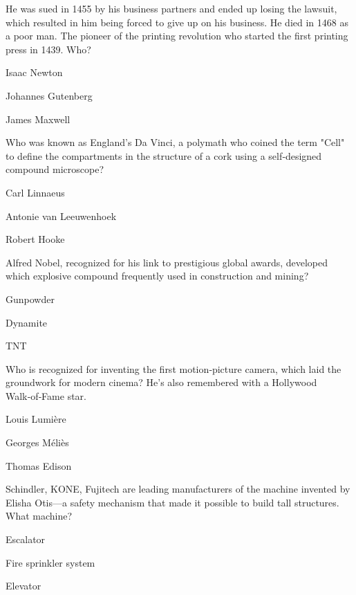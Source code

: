 
\begin{enhancedmcq}{He was sued in 1455 by his business partners and ended up losing the lawsuit, which resulted in him being forced to give up on his business. He died in 1468 as a poor man. The pioneer of the printing revolution who started the first printing press in 1439. Who?}
\item Isaac Newton
\item Johannes Gutenberg
\item James Maxwell

\end{enhancedmcq}
\begin{enhancedmcq}{Who was known as England's Da Vinci, a polymath who coined the term "Cell" to define the compartments in the structure of a cork using a self‑designed compound microscope?}
\item Carl Linnaeus
\item Antonie van Leeuwenhoek
\item Robert Hooke

\end{enhancedmcq}
\begin{enhancedmcq}{Alfred Nobel, recognized for his link to prestigious global awards, developed which explosive compound frequently used in construction and mining?}
\item Gunpowder
\item Dynamite
\item TNT

\end{enhancedmcq}
\begin{enhancedmcq}{Who is recognized for inventing the first motion‑picture camera, which laid the groundwork for modern cinema? He's also remembered with a Hollywood Walk‑of‑Fame star.}
\item Louis Lumière
\item Georges Méliès
\item Thomas Edison

\end{enhancedmcq}
\begin{enhancedmcq}{Schindler, KONE, Fujitech are leading manufacturers of the machine invented by Elisha Otis—a safety mechanism that made it possible to build tall structures. What machine?}
\item Escalator
\item Fire sprinkler system
\item Elevator

\end{enhancedmcq}
